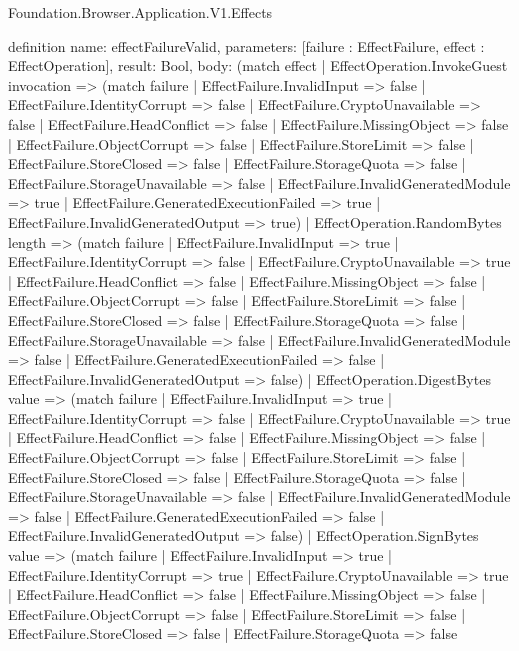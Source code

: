 \begin{lexlean}{Foundation.Browser.Application.V1.Effects}
\begin{semanticmodule}
definition{
  name: effectFailureValid,
  parameters: [failure : EffectFailure, effect : EffectOperation],
  result: Bool,
  body: (match effect
    | EffectOperation.InvokeGuest invocation => (match failure
      | EffectFailure.InvalidInput => false
      | EffectFailure.IdentityCorrupt => false
      | EffectFailure.CryptoUnavailable => false
      | EffectFailure.HeadConflict => false
      | EffectFailure.MissingObject => false
      | EffectFailure.ObjectCorrupt => false
      | EffectFailure.StoreLimit => false
      | EffectFailure.StoreClosed => false
      | EffectFailure.StorageQuota => false
      | EffectFailure.StorageUnavailable => false
      | EffectFailure.InvalidGeneratedModule => true
      | EffectFailure.GeneratedExecutionFailed => true
      | EffectFailure.InvalidGeneratedOutput => true)
    | EffectOperation.RandomBytes length => (match failure
      | EffectFailure.InvalidInput => true
      | EffectFailure.IdentityCorrupt => false
      | EffectFailure.CryptoUnavailable => true
      | EffectFailure.HeadConflict => false
      | EffectFailure.MissingObject => false
      | EffectFailure.ObjectCorrupt => false
      | EffectFailure.StoreLimit => false
      | EffectFailure.StoreClosed => false
      | EffectFailure.StorageQuota => false
      | EffectFailure.StorageUnavailable => false
      | EffectFailure.InvalidGeneratedModule => false
      | EffectFailure.GeneratedExecutionFailed => false
      | EffectFailure.InvalidGeneratedOutput => false)
    | EffectOperation.DigestBytes value => (match failure
      | EffectFailure.InvalidInput => true
      | EffectFailure.IdentityCorrupt => false
      | EffectFailure.CryptoUnavailable => true
      | EffectFailure.HeadConflict => false
      | EffectFailure.MissingObject => false
      | EffectFailure.ObjectCorrupt => false
      | EffectFailure.StoreLimit => false
      | EffectFailure.StoreClosed => false
      | EffectFailure.StorageQuota => false
      | EffectFailure.StorageUnavailable => false
      | EffectFailure.InvalidGeneratedModule => false
      | EffectFailure.GeneratedExecutionFailed => false
      | EffectFailure.InvalidGeneratedOutput => false)
    | EffectOperation.SignBytes value => (match failure
      | EffectFailure.InvalidInput => true
      | EffectFailure.IdentityCorrupt => true
      | EffectFailure.CryptoUnavailable => true
      | EffectFailure.HeadConflict => false
      | EffectFailure.MissingObject => false
      | EffectFailure.ObjectCorrupt => false
      | EffectFailure.StoreLimit => false
      | EffectFailure.StoreClosed => false
      | EffectFailure.StorageQuota => false
}
\end{semanticmodule}
\end{lexlean}
